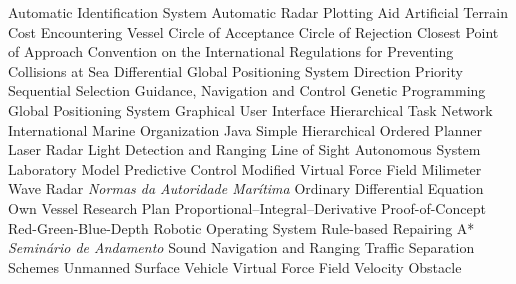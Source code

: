 \begin{acronym}
      {Automatic Identification System}
     {Automatic Radar Plotting Aid}
      {Artificial Terrain Cost}
       {Encountering Vessel}
      {Circle of Acceptance}
      {Circle of Rejection}
      {Closest Point of Approach}
  {Convention on the International Regulations for Preventing Collisions at Sea}
     {Differential Global Positioning System}
     {Direction Priority Sequential Selection}
      {Guidance, Navigation and Control}
       {Genetic Programming}
      {Global Positioning System}
      {Graphical User Interface}
      {Hierarchical Task Network}
      {International Marine Organization}
    {Java Simple Hierarchical Ordered Planner}
    {Laser Radar}
    {Light Detection and Ranging}
      {Line of Sight}
      {Autonomous System Laboratory}
      {Model Predictive Control}
     {Modified Virtual Force Field}
      {Milimeter Wave Radar}
   {\textit{Normas da Autoridade Marítima}}
      {Ordinary Differential Equation}
       {Own Vessel}
      {Research Plan}
      {Proportional–Integral–Derivative}
      {Proof-of-Concept}
     {Red-Green-Blue-Depth}
      {Robotic Operating System}
    {Rule-based Repairing A*}
       {\textit{Seminário de Andamento}}
    {Sound Navigation and Ranging}
      {Traffic Separation Schemes}
      {Unmanned Surface Vehicle}
      {Virtual Force Field}
       {Velocity Obstacle}
\end{acronym}